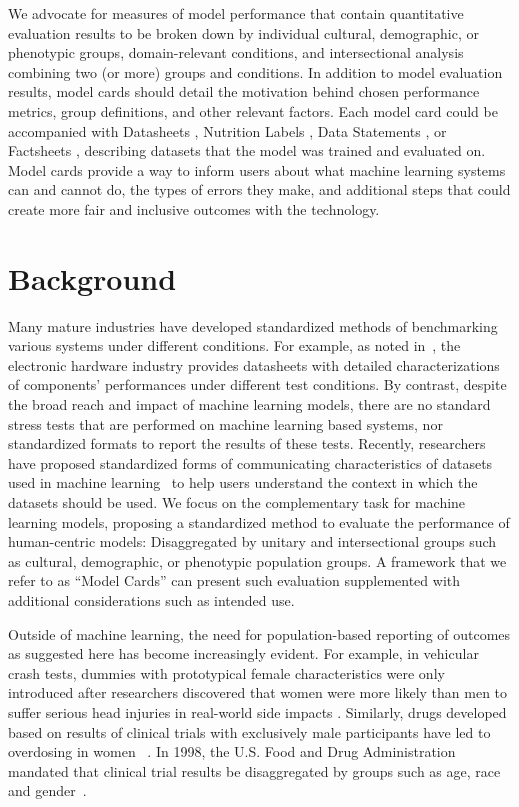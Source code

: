 \documentclass[format=sigconf]{acmart}
\begin{document}
We advocate for measures of model performance that contain quantitative evaluation results to be broken down by individual cultural, demographic, or phenotypic groups, domain-relevant conditions, and intersectional analysis combining two (or more) groups and conditions. In addition to model evaluation results, model cards should detail the motivation behind chosen performance metrics, group definitions, and other relevant factors. Each model card could be accompanied with Datasheets \cite{GebruEtAl2018}, Nutrition Labels \cite{HollandEtAl2018}, Data Statements \cite{statements}, or Factsheets \cite{factsheets}, describing datasets that the model was trained and evaluated on. Model cards provide a way to inform users about what machine learning systems can and cannot do, the types of errors they make, and additional steps that could create more fair and inclusive outcomes with the technology.


\section{Background}

Many mature industries have developed standardized methods of benchmarking various systems under different conditions. 
For example, as noted in~\cite{GebruEtAl2018}, the electronic hardware industry provides datasheets with detailed characterizations of components' performances under different test conditions. By contrast, despite the broad reach and impact of machine learning models, there are no standard stress tests that are performed on machine learning based systems, nor standardized formats to report the results of these tests. Recently, researchers have proposed standardized forms of communicating characteristics of datasets used in machine learning~\cite{GebruEtAl2018,HollandEtAl2018, statements} to help users understand the context in which the datasets should be used. 
We focus on the complementary task for machine learning models, proposing a standardized method to evaluate the performance of human-centric models:  Disaggregated by unitary and intersectional groups such as cultural, demographic, or phenotypic population groups.  A framework that we refer to as ``Model Cards'' can present such evaluation supplemented with additional considerations such as intended use.

Outside of machine learning, the need for population-based reporting of outcomes as suggested here has become increasingly evident. For example, in vehicular crash tests, dummies with prototypical female characteristics were only introduced after researchers discovered that women were more likely than men to suffer serious head injuries in real-world side impacts \cite{IIHS2003}. 
Similarly, drugs developed based on results of clinical trials with exclusively male participants have led to overdosing in women~ \cite{GuardianFDA,FDA2013}. In 1998, the U.S. Food and Drug Administration mandated that clinical trial results be disaggregated by groups such as age, race and gender~\cite{fda1998}.  
\end{document}
